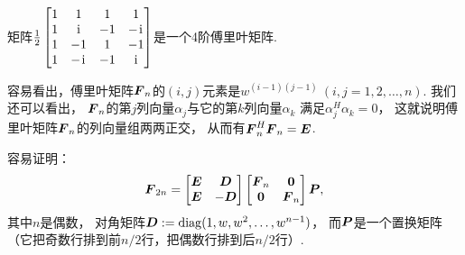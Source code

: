 \begin{example}
矩阵\(
	\frac12
	\begin{bmatrix}
		1 & 1 & 1 & 1 \\
		1 & \kern1pt\mathrm{i}\kern1pt & -1 & -\kern1pt\mathrm{i}\kern1pt \\
		1 & -1 & 1 & -1 \\
		1 & -\kern1pt\mathrm{i}\kern1pt & -1 & \kern1pt\mathrm{i}\kern1pt
	\end{bmatrix}
\)是一个4阶傅里叶矩阵.
\end{example}

容易看出，傅里叶矩阵\(\boldsymbol{F}_n\)的\((i,j)\)元素是\(
	w^{(i-1)(j-1)}
	\ (i,j=1,2,\dotsc,n)
\).
我们还可以看出，
\(\boldsymbol{F}_n\)的第\(j\)列向量\(\alpha_j\)与它的第\(k\)列向量\(\alpha_k\)
满足\(\alpha_j^H \alpha_k = 0\)，
这就说明傅里叶矩阵\(\boldsymbol{F}_n\)的列向量组两两正交，
从而有\(\boldsymbol{F}_n^H \boldsymbol{F}_n = \boldsymbol{E}\).

容易证明：\begin{equation*}
	\boldsymbol{F}_{2n}
	= \begin{bmatrix}
		\boldsymbol{E} & \boldsymbol{D} \\
		\boldsymbol{E} & -\boldsymbol{D}
	\end{bmatrix}
	\begin{bmatrix}
		\boldsymbol{F}_n & \boldsymbol0 \\
		\boldsymbol0 & \boldsymbol{F}_n
	\end{bmatrix}
	\boldsymbol{P},
\end{equation*}
其中\(n\)是偶数，
对角矩阵\(
	\boldsymbol{D} := \operatorname{diag}(1,w,w^2,\dotsc,w^{n-1})
\)，
而\(\boldsymbol{P}\)是一个置换矩阵
（它把奇数行排到前\(n/2\)行，把偶数行排到后\(n/2\)行）.

